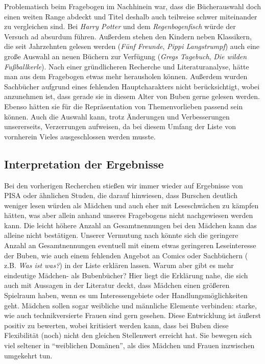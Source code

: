 

Problematisch beim Fragebogen im Nachhinein war, dass die Bücherauswahl
doch einen weiten Range abdeckt und Titel deshalb auch teilweise schwer
miteinander zu vergleichen sind. Bei \emph{Harry Potter} und dem
\emph{Regenbogenfisch} würde der Versuch ad absurdum führen. Außerdem
stehen den Kindern neben Klassikern, die seit Jahrzehnten gelesen werden
(\emph{Fünf Freunde}, \emph{Pippi Langstrumpf}) auch eine große Auswahl
an neuen Büchern zur Verfügung (\emph{Gregs Tagebuch}, \emph{Die wilden
Fußballkerle}). Nach einer gründlicheren Recherche und Literaturanalyse,
hätte man aus dem Fragebogen etwas mehr herausholen können. Außerdem
wurden Sachbücher aufgrund eines fehlenden Hauptcharakters nicht
berücksichtigt, wobei anzunehmen ist, dass gerade sie in diesem Alter
von Buben gerne gelesen werden. Ebenso hätten sie für die Repräsentation
von Themenvorlieben passend sein können. Auch die Auswahl kann, trotz
Änderungen und Verbesserungen unsererseits, Verzerrungen aufweisen, da
bei diesem Umfang der Liste von vornherein Vieles ausgeschlossen werden
musste.

\subsection{Interpretation der Ergebnisse}

Bei den vorherigen Recherchen stießen wir immer wieder auf Ergebnisse
von PISA oder ähnlichen Studen, die darauf hinwiesen, dass Burschen
deutlich weniger lesen würden als Mädchen und auch eher mit
Leseschwächen zu kämpfen hätten, was aber allein anhand unseres
Fragebogens nicht nachgewiesen werden kann. Die leicht höhere Anzahl an
Gesamtnennungen bei den Mädchen kann das alleine nicht bestätigen.
Unserer Vermutung nach könnte sich die geringere Anzahl an
Gesamtnennungen eventuell mit einem etwas geringeren Leseinteresse der
Buben, wie auch einem fehlenden Angebot an Comics oder Sachbüchern (
z.B. \emph{Was ist was?}) in der Liste erklären lassen. Warum aber gibt
es mehr eindeutige Mädchen- als Bubenbücher? Hier liegt die Erklärung
nahe, die sich auch mit Aussagen in der Literatur deckt, dass Mädchen
einen größeren Spielraum haben, wenn es um Interessengebiete oder
Handlungsmöglichkeiten geht. Mädchen sollen sogar weibliche und
männliche Elemente verbinden: starke, wie auch technikversierte Frauen
sind gern gesehen. Diese Entwicklung ist äußerst positiv zu bewerten,
wobei kritisiert werden kann, dass bei Buben diese Flexibilität (noch)
nicht den gleichen Stellenwert erreicht hat. Sie bewegen sich viel
seltener in ``weiblichen Domänen'', als dies Mädchen und Frauen
inzwischen umgekehrt tun.

